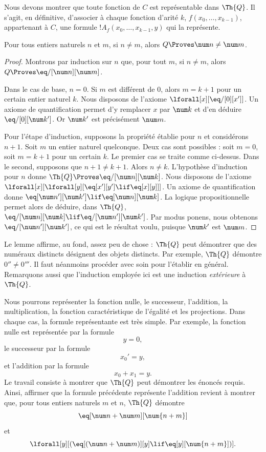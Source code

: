\documentclass[../../../include/open-logic-section]{subfiles}
\begin{document}

Nous devons montrer que toute fonction de $C$ est représentable
dans $\Th{Q}$. Il s'agit, en définitive, d'associer à chaque
fonction d'arité $k$, $f(x_0,\dots,x_{k-1})$, appartenant à $C$,
une formule $!A_f(x_0,\dots,x_{k-1},y)$ qui la représente.

\begin{lem}
Pour tous entiers naturels $n$ et $m$, si $n\neq m$, alors
$Q\Proves\num n\neq\num m$.
\end{lem}

\begin{proof}
Montrons par induction sur $n$ que, pour tout $m$, si
$n\neq m$, alors $Q\Proves\eq/[\num n][\num m]$.

Dans le cas de base, $n=0$. Si $m$ est différent de $0$,
alors $m=k+1$ pour un certain entier naturel $k$.
Nous disposons de l'axiome $\lforall[x][\eq/[0][x']]$.
Un axiome de quantification permet d'y remplacer $x$ par
$\num k$ et d'en déduire $\eq/[0][\num k']$.
Or $\num k'$ est précisément $\num m$.

Pour l'étape d'induction, supposons la propriété établie
pour $n$ et considérons $n+1$. Soit $m$ un entier naturel
quelconque. Deux cas sont possibles : soit $m=0$, soit
$m=k+1$ pour un certain $k$. Le premier cas se traite comme
ci-dessus. Dans le second, supposons que $n+1\neq k+1$.
Alors $n\neq k$. L'hypothèse d'induction pour $n$ donne
$\Th{Q}\Proves\eq/[\num n][\num k]$.
Nous disposons de l'axiome
$\lforall[x][\lforall[y][\eq[x'][y']\lif\eq[x][y]]]$.
Un axiome de quantification donne
$\eq[\num n'][\num k']\lif\eq[\num n][\num k]$.
La logique propositionnelle permet alors de déduire, dans
$\Th{Q}$,
$\eq/[\num n][\num k]\lif\eq/[\num n'][\num k']$.
Par modus ponens, nous obtenons
$\eq/[\num n'][\num k']$, ce qui est le résultat voulu,
puisque $\num k'$ est $\num m$.
\end{proof}

Le lemme affirme, au fond, assez peu de chose :
$\Th{Q}$ peut démontrer que des numéraux distincts désignent
des objets distincts. Par exemple, $\Th{Q}$ démontre
$0''\neq 0'''$. Il faut néanmoins procéder avec soin pour
l'établir en général. Remarquons aussi que l'induction
employée ici est une induction \emph{extérieure} à
$\Th{Q}$.

Nous pourrons représenter la fonction nulle, le successeur,
l'addition, la multiplication, la fonction caractéristique
de l'égalité et les projections. Dans chaque cas, la formule
représentante est très simple. Par exemple, la fonction
nulle est représentée par la formule
\[
y = 0,
\]
le successeur par la formule
\[
x_0' = y,
\]
et l'addition par la formule
\[
x_0 + x_1 = y.
\]
Le travail consiste à montrer que $\Th{Q}$ peut démontrer
les énoncés requis. Ainsi, affirmer que la formule précédente
représente l'addition revient à montrer que, pour tous
entiers naturels $m$ et $n$, $\Th{Q}$ démontre
\[
\eq[\num n + \num m][\num {n+m}]
\]
et
\[
\lforall[y][(\eq[(\num n + \num m)][y] \lif \eq[y][\num {n+m}])].
\]
\end{document}
